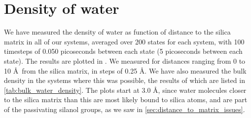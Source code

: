 \section{Density of water\label{sec:results_density}}

We have measured the density of water as function of distance to the silica matrix in all of our systems, averaged over 200 states for each system, with 100 timesteps of 0.050 picoseconds between each state (5 picoseconds between each state). The results are plotted in . We measured for distances ranging from 0 to 10 \AA\ from the silica matrix, in steps of 0.25 \AA. We have also measured the bulk density in the systems where this was possible, the results of which are listed in \cref{tab:bulk_water_density}. The plots start at 3.0 \AA, since water molecules closer to the silica matrix than this are most likely bound to silica atoms, and are part of the passivating silanol groups, as we saw in \cref{sec:distance_to_matrix_issues}.%
%
